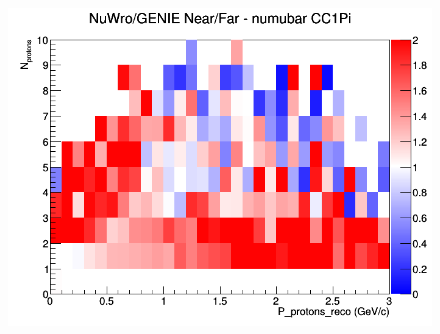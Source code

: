 \documentclass[12pt]{article}
\begin{document}
\begin{figure}[h]
\endminipage
{}
\includegraphics[width=\linewidth]{eff_N_P/FGT/protons/ratios/CC1Pi_NuWro_GENIE_numubar_NF_N_P.png}
\endminipage
\newline
\end{figure}
\clearpage
\end{document}
